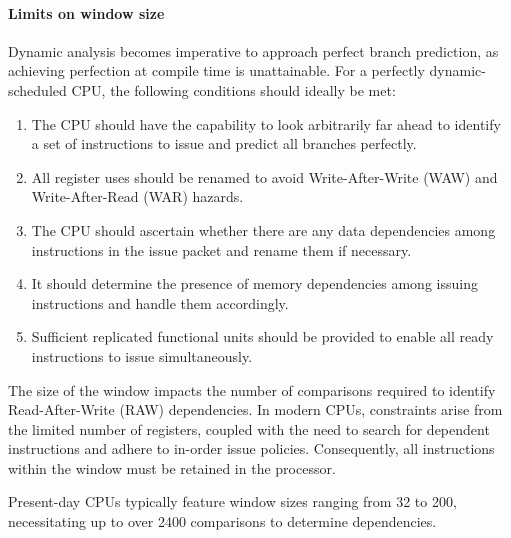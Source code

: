 \paragraph*{Limits on window size}
Dynamic analysis becomes imperative to approach perfect branch prediction, as achieving perfection at compile time is unattainable.
For a perfectly dynamic-scheduled CPU, the following conditions should ideally be met:
\begin{enumerate}
    \item The CPU should have the capability to look arbitrarily far ahead to identify a set of instructions to issue and predict all branches perfectly.
    \item All register uses should be renamed to avoid Write-After-Write (WAW) and Write-After-Read (WAR) hazards.
    \item The CPU should ascertain whether there are any data dependencies among instructions in the issue packet and rename them if necessary.
    \item It should determine the presence of memory dependencies among issuing instructions and handle them accordingly.
    \item Sufficient replicated functional units should be provided to enable all ready instructions to issue simultaneously.
\end{enumerate}
The size of the window impacts the number of comparisons required to identify Read-After-Write (RAW) dependencies. 
In modern CPUs, constraints arise from the limited number of registers, coupled with the need to search for dependent instructions and adhere to in-order issue policies. 
Consequently, all instructions within the window must be retained in the processor.

Present-day CPUs typically feature window sizes ranging from 32 to 200, necessitating up to over 2400 comparisons to determine dependencies.


